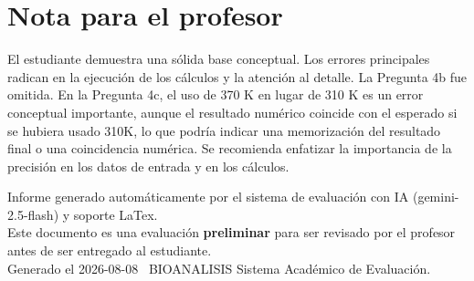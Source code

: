 \documentclass[11pt,a4paper]{article}
\begin{document}
\section*{Nota para el profesor}
\begin{tcolorbox}[
  enhanced, breakable,
  colback=yellow!8, colframe=yellow!60!black,
  fonttitle=\bfseries, coltitle=black,
  title={Observaciones para revisión manual},
  top=4pt, bottom=4pt, left=8pt, right=8pt,
]
El estudiante demuestra una sólida base conceptual. Los errores principales radican en la ejecución de los cálculos y la atención al detalle. La Pregunta 4b fue omitida. En la Pregunta 4c, el uso de 370 K en lugar de 310 K es un error conceptual importante, aunque el resultado numérico coincide con el esperado si se hubiera usado 310K, lo que podría indicar una memorización del resultado final o una coincidencia numérica. Se recomienda enfatizar la importancia de la precisión en los datos de entrada y en los cálculos.
\end{tcolorbox}

\vspace{12pt}
\begin{center}
  \footnotesize\color{gray}
  Informe generado automáticamente por el sistema de evaluación con IA (gemini-2.5-flash) y soporte LaTex. \\
  Este documento es una evaluación \textbf{preliminar} para ser revisado por el profesor antes de ser entregado al 
  estudiante. \\
  Generado el 2026-08-08 \textbullet\ BIOANALISIS Sistema Académico de Evaluación.
  \end{center}
\end{document}
